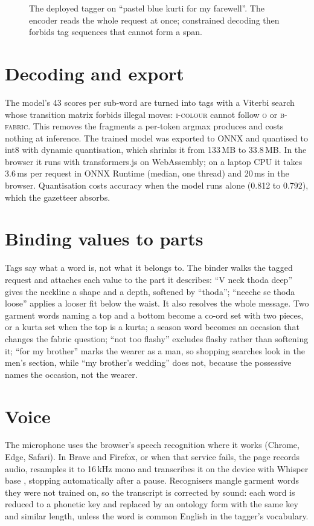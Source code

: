 \begin{figure}[tbp]
\centering
\resizebox{\linewidth}{!}{}
\caption{The deployed tagger on ``pastel blue kurti for my farewell''. The encoder reads the whole request at once; constrained decoding then forbids tag sequences that cannot form a span.}
\label{fig:tagger}
\end{figure}

\section{Decoding and export}
The model's 43 scores per sub-word are turned into tags with a Viterbi search whose transition matrix forbids illegal moves: \textsc{i-colour} cannot follow \textsc{o} or \textsc{b-fabric}. This removes the fragments a per-token argmax produces and costs nothing at inference. The trained model was exported to ONNX and quantised to int8 with dynamic quantisation, which shrinks it from 133\,MB to 33.8\,MB. In the browser it runs with transformers.js on WebAssembly; on a laptop CPU it takes 3.6\,ms per request in ONNX Runtime (median, one thread) and 20\,ms in the browser. Quantisation costs accuracy when the model runs alone (0.812 to 0.792), which the gazetteer absorbs.

\section{Binding values to parts}
Tags say what a word is, not what it belongs to. The binder walks the tagged request and attaches each value to the part it describes: ``V neck thoda deep'' gives the neckline a shape and a depth, softened by ``thoda''; ``neeche se thoda loose'' applies a looser fit below the waist. It also resolves the whole message. Two garment words naming a top and a bottom become a co-ord set with two pieces, or a kurta set when the top is a kurta; a season word becomes an occasion that changes the fabric question; ``not too flashy'' excludes flashy rather than softening it; ``for my brother'' marks the wearer as a man, so shopping searches look in the men's section, while ``my brother's wedding'' does not, because the possessive names the occasion, not the wearer.

\section{Voice}
The microphone uses the browser's speech recognition where it works (Chrome, Edge, Safari). In Brave and Firefox, or when that service fails, the page records audio, resamples it to 16\,kHz mono and transcribes it on the device with Whisper base \cite{radford2023whisper}, stopping automatically after a pause. Recognisers mangle garment words they were not trained on, so the transcript is corrected by sound: each word is reduced to a phonetic key and replaced by an ontology form with the same key and similar length, unless the word is common English in the tagger's vocabulary.

